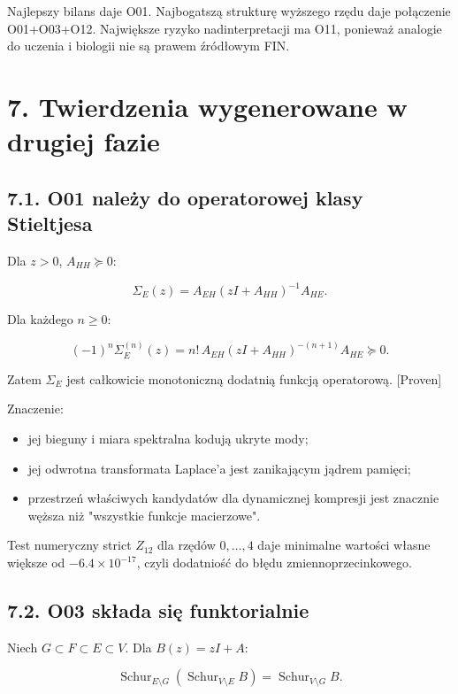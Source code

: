 \documentclass[11pt,a4paper,openany]{report}
\newcommand{\statusProven}{\textcolor{fingreen}{[Proven]}}
\begin{document}
Najlepszy bilans daje O01. Najbogatszą strukturę wy\.zszego rzędu daje połączenie O01+O03+O12. Największe ryzyko nadinterpretacji ma O11, poniewa\.z analogie do uczenia i biologii nie są prawem źródłowym FIN.

\chapter{7. Twierdzenia wygenerowane w drugiej fazie}

\section{7.1. O01 nale\.zy do operatorowej klasy Stieltjesa}

Dla \(z>0\), \(A_{HH}\succeq0\):

\[
\Sigma_E(z)
=A_{EH}(zI+A_{HH})^{-1}A_{HE}.
\]

Dla ka\.zdego \(n\geq0\):

\[
(-1)^n\Sigma_E^{(n)}(z)
=n!\,
A_{EH}(zI+A_{HH})^{-(n+1)}A_{HE}
\succeq0.
\]

Zatem \(\Sigma_E\) jest całkowicie monotoniczną dodatnią funkcją operatorową. \statusProven{}

Znaczenie:

\begin{itemize}
\item 
jej bieguny i miara spektralna kodują ukryte mody;

\item 
jej odwrotna transformata Laplace'a jest zanikającym jądrem pamięci;

\item 
przestrzeń właściwych kandydatów dla dynamicznej kompresji jest znacznie wę\.zsza ni\.z "wszystkie funkcje macierzowe".

\end{itemize}

Test numeryczny strict \(Z_{12}\) dla rzędów \(0,\ldots,4\) daje minimalne wartości własne większe od \(-6.4\times10^{-17}\), czyli dodatniość do błędu zmiennoprzecinkowego.

\section{7.2. O03 składa się funktorialnie}

Niech \(G\subset F\subset E\subset V\). Dla \(B(z)=zI+A\):

\[
\operatorname{Schur}_{E\setminus G}
\left(
\operatorname{Schur}_{V\setminus E}B
\right)
=
\operatorname{Schur}_{V\setminus G}B.
\]
\end{document}
